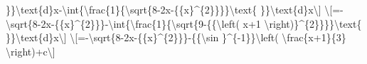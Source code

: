 \}\}\textbackslash text\{d\}x-\textbackslash int\{\textbackslash frac\{1\}\{\textbackslash sqrt\{8-2x-\{\{x\}\textasciicircum\{2\}\}\}\}\textbackslash text\{
\}\}\textbackslash text\{d\}x\textbackslash{]} \textbackslash{[}=-\textbackslash sqrt\{8-2x-\{\{x\}\textasciicircum\{2\}\}\}-\textbackslash int\{\textbackslash frac\{1\}\{\textbackslash sqrt\{9-\{\{\textbackslash left(
x+1 \textbackslash right)\}\textasciicircum\{2\}\}\}\}\textbackslash text\{
\}\}\textbackslash text\{d\}x\textbackslash{]} \textbackslash{[}=-\textbackslash sqrt\{8-2x-\{\{x\}\textasciicircum\{2\}\}\}-\{\{\textbackslash sin
\}\textasciicircum\{-1\}\}\textbackslash left( \textbackslash frac\{x+1\}\{3\}
\textbackslash right)+c\textbackslash{]}